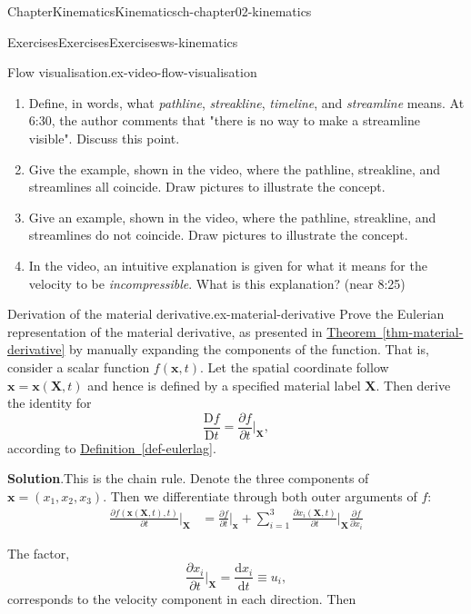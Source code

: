 \documentclass[oneside,10pt,]{book}
\newcommand{\blocktitlefont}{\relax}
\newcommand{\xreffont}{\relax}
\numberwithin{equation}{section}
\newcommand{\de}{\mathrm{d}}
\newcommand{\dd}[2]{\frac{\de#1}{\de#2}}
\newcommand{\DD}[2]{\frac{\mathrm{D}#1}{\mathrm{D}#2}}
\newcommand{\pd}[2]{\frac{\partial#1}{\partial#2}}
\newcommand{\bx}{\boldsymbol{x}}
\newcommand{\bX}{\boldsymbol{X}}
\begin{document}
\begin{chapterptx}{Chapter}{Kinematics}{}{Kinematics}{}{}{ch-chapter02-kinematics}
\begin{exercises-section}{Exercises}{Exercises}{}{Exercises}{}{}{ws-kinematics}
\begin{divisionexercise}{1}{Flow visualisation.}{}{ex-video-flow-visualisation}
\begin{enumerate}[font=\bfseries,label=(\alph*),ref=\alph*]
\item{}Define, in words, what \emph{pathline}, \emph{streakline}, \emph{timeline}, and \emph{streamline} means. At 6:30, the author comments that "there is no way to make a streamline visible". Discuss this point.%
\item{}Give the example, shown in the video, where the pathline, streakline, and streamlines all coincide. Draw pictures to illustrate the concept.%
\item{}Give an example, shown in the video, where the pathline, streakline, and streamlines do not coincide. Draw pictures to illustrate the concept.%
\item{}In the video, an intuitive explanation is given for what it means for the velocity to be \emph{incompressible}. What is this explanation? (near 8:25)%
\end{enumerate}%
\end{divisionexercise}%
\begin{divisionexercise}{2}{Derivation of the material derivative.}{}{ex-material-derivative}%
Prove the Eulerian representation of the material derivative, as presented in \hyperref[thm-material-derivative]{Theorem~{\xreffont\ref{thm-material-derivative}}} by manually expanding the components of the function. That is, consider a scalar function \(f(\bx, t)\). Let the spatial coordinate follow \(\bx = \bx(\bX,t)\) and hence is defined by a specified material label \(\bX\). Then derive the identity for%
\begin{equation*}
\DD{f}{t} = \pd{f}{t} \biggr\rvert_{\bX},
\end{equation*}
according to \hyperref[def-eulerlag]{Definition~{\xreffont\ref{def-eulerlag}}}.%
\par\smallskip%
\noindent\textbf{\blocktitlefont Solution}.\hypertarget{ex-material-derivative-3}{}\quad{}This is the chain rule. Denote the three components of \(\bx = (x_1, x_2, x_3)\). Then we differentiate through both outer arguments of \(f\):%
\begin{align*}
\pd{f(\bx(\bX, t), t)}{t}\biggr\rvert_{\bX} &= \pd{f}{t}\biggr\rvert_{\bx} + \sum_{i=1}^3 \pd{x_i(\bX, t)}{t}\biggr\rvert_{\bX} \pd{f}{x_i} 
\end{align*}
%
\par
The factor,%
\begin{equation*}
\pd{x_i}{t}\biggr\rvert_{\bX} = \dd{x_i}{t} \equiv u_i,
\end{equation*}
corresponds to the velocity component in each direction. Then%
\begin{equation*}

\end{equation*}
\end{divisionexercise}
\end{exercises-section}
\end{chapterptx}
\end{document}
